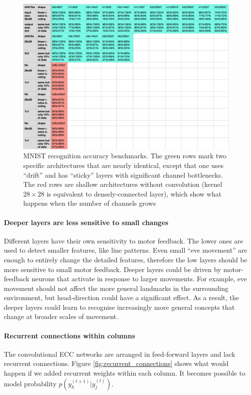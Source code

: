 \documentclass[12pt]{article}
\begin{document}
\begin{figure}[!htbp]
	\centering
	\includegraphics[width=13.8cm]{benchmarks_votes}
	\caption{MNIST recognition accuracy benchmarks. The green rows mark two specific architectures that are nearly identical, except that one uses ``drift'' and has ``sticky'' layers with significant channel bottlenecks.  The red rows are shallow architectures without convolution (kernel $28\times 28$ is equivalent to densely-connected layer), which show what happens when the number of channels grows}
	\label{fig:benchmarks}
\end{figure} 

\paragraph{Deeper layers are less sensitive to small changes} 
Different layers have their own sensitivity to motor feedback. The lower ones are used to detect smaller features, like line patterns. Even small ``eve movement'' are enough to entirely change the detailed features, therefore the low layers should be more sensitive to small motor feedback. Deeper layers could be driven by motor-feedback neurons that activate in response to larger movements. For example, eve movement should not affect the more general landmarks in the surrounding environment, but head-direction could have a significant effect. As a result, the deeper  layers could learn to recognise increasingly more general concepts that change at broader scales of movement. 

\paragraph{Recurrent connections within columns}
The convolutional ECC networks are arranged in feed-forward layers and lack recurrent connections. Figure \ref{fig:recurrent_connections} shows what would happen if we added recurrent weights within each column. It becomes possible to model probability $p(y_h^{(t+1)}|y_j^{(t)})$. 
\end{document}
